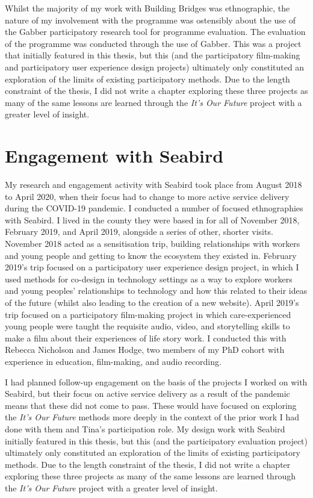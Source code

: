 Whilst the majority of my work with Building Bridges was ethnographic, the nature of my involvement with the programme was ostensibly about the use of the Gabber \cite{rainey_gabber_2019} participatory research tool for programme evaluation. The evaluation of the programme was conducted through the use of Gabber. This was a project that initially featured in this thesis, but this (and the participatory film-making and participatory user experience design projects) ultimately only constituted an exploration of the limits of existing participatory methods. Due to the length constraint of the thesis, I did not write a chapter exploring these three projects as many of the same lessons are learned through the \textit{It's Our Future} project with a greater level of insight.

\section{Engagement with Seabird}
My research and engagement activity with Seabird took place from August 2018 to April 2020, when their focus had to change to more active service delivery during the COVID-19 pandemic. I conducted a number of focused ethnographies with Seabird. I lived in the county they were based in for all of November 2018, February 2019, and April 2019, alongside a series of other, shorter visits. November 2018 acted as a sensitisation trip, building relationships with workers and young people and getting to know the ecosystem they existed in. February 2019's trip focused on a participatory user experience design project, in which I used methods for co-design in technology settings as a way to explore workers and young peoples' relationships to technology and how this related to their ideas of the future (whilst also leading to the creation of a new website). April 2019's trip focused on a participatory film-making project in which care-experienced young people were taught the requisite audio, video, and storytelling skills to make a film about their experiences of life story work. I conducted this with Rebecca Nicholson and James Hodge, two members of my PhD cohort with experience in education, film-making, and audio recording. 

I had planned follow-up engagement on the basis of the projects I worked on with Seabird, but their focus on active service delivery as a result of the pandemic means that these did not come to pass. These would have focused on exploring the \textit{It's Our Future} methods more deeply in the context of the prior work I had done with them and Tina's participation role. My design work with Seabird initially featured in this thesis, but this (and the participatory evaluation project) ultimately only constituted an exploration of the limits of existing participatory methods. Due to the length constraint of the thesis, I did not write a chapter exploring these three projects as many of the same lessons are learned through the \textit{It's Our Future} project with a greater level of insight.

